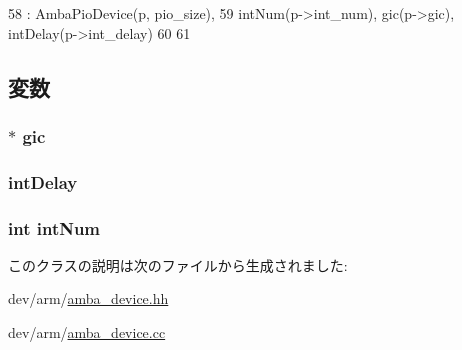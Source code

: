 \begin{DoxyCode}
58     : AmbaPioDevice(p, pio_size),
59       intNum(p->int_num), gic(p->gic), intDelay(p->int_delay)
60 {
61 }
\end{DoxyCode}


\subsection{変数}
\hypertarget{classAmbaIntDevice_a2e2266dca56928f63667e994933169ee}{
\subsubsection[{gic}]{$\ast$ {\bf gic}}}
\label{classAmbaIntDevice_a2e2266dca56928f63667e994933169ee}
\hypertarget{classAmbaIntDevice_a0dad0b6dbada03eb5daf9c1ed859d62e}{
\subsubsection[{intDelay}]{ {\bf intDelay}}}
\label{classAmbaIntDevice_a0dad0b6dbada03eb5daf9c1ed859d62e}
\hypertarget{classAmbaIntDevice_a9bd4d49b818d8cf1a6dee0576d2ff039}{
\subsubsection[{intNum}]{\setlength{\rightskip}{0pt plus 5cm}int {\bf intNum}}}
\label{classAmbaIntDevice_a9bd4d49b818d8cf1a6dee0576d2ff039}


このクラスの説明は次のファイルから生成されました:\begin{DoxyCompactItemize}
\item 
dev/arm/\hyperlink{amba__device_8hh}{amba\_\-device.hh}\item 
dev/arm/\hyperlink{amba__device_8cc}{amba\_\-device.cc}\end{DoxyCompactItemize}
